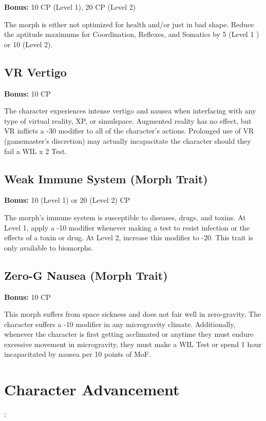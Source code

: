\textbf{Bonus:} 10 CP (Level 1), 20 CP (Level 2)

The morph is either not optimized for health and/or just in bad shape. Reduce the aptitude maximums for Coordination, Reflexes, and Somatics by 5 (Level 1 ) or 10 (Level 2).

\subsection{VR Vertigo}
\label{sec:traits-vr-vertigo}

\textbf{Bonus:} 10 CP

The character experiences intense vertigo and nausea when interfacing with any type of virtual reality, XP, or simulspace. Augmented reality has no effect, but VR inflicts a -30 modifier to all of the character’s actions. Prolonged use of VR (gamemaster’s discretion) may actually incapacitate the character should they fail a WIL x 2 Test.

\subsection{Weak Immune System (Morph Trait)}
\label{sec:traits-weak-immune-system}

\textbf{Bonus:} 10 (Level 1) or 20 (Level 2) CP

The morph’s immune system is susceptible to diseases, drugs, and toxins. At Level 1, apply a -10 modifier whenever making a test to resist infection or the effects of a toxin or drug. At Level 2, increase this modifier to -20. This trait is only available to biomorphs.

\subsection{Zero-G Nausea (Morph Trait)}
\label{sec:traits-zero-g-nausea}

\textbf{Bonus:} 10 CP

This morph suffers from space sickness and does not fair well in zero-gravity. The character suffers a -10 modifier in any microgravity climate. Additionally, whenever the character is first getting acclimated or anytime they must endure excessive movement in microgravity, they must make a WIL Test or spend 1 hour incapacitated by nausea per 10 points of MoF.

\section{Character Advancement}:
\label{sec:character-advancement}

